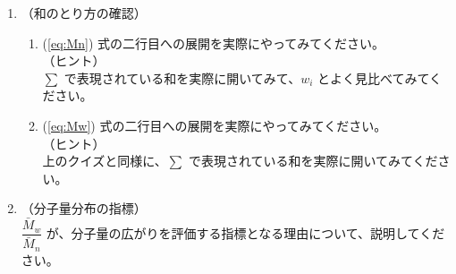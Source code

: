 \documentclass[a4paper,11pt]{ltjsarticle}
\begin{document}
	\begin{enumerate}
	\item
	（和のとり方の確認）\\
		\vspace{-5mm}
		\begin{enumerate}
		\item
		\label{it:4-1}
		(\ref{eq:Mn}) 式の二行目への展開を実際にやってみてください。\\
		（ヒント）\\
		$\sum$ で表現されている和を実際に開いてみて、$w_i$ とよく見比べてみてください。

		\item
		\label{it:4-2}
		(\ref{eq:Mw}) 式の二行目への展開を実際にやってみてください。\\
		（ヒント）\\
		上のクイズと同様に、$\sum$ で表現されている和を実際に開いてみてください。
		\end{enumerate}
	\item
	（分子量分布の指標）\\
	\label{it:4-3}
	$\dfrac{\bar{M}_w}{\bar{M}_n}$ が、分子量の広がりを評価する指標となる理由について、説明してください。

	\end{enumerate}
\end{document}
